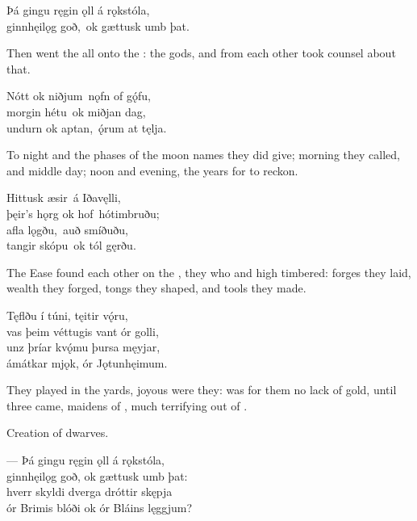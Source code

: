 \bva Þá gingu ręgin ǫll \hld á rǫkstóla, \\%
ginnhęilǫg goð, \hld ok gættusk umb þat.\footnotemark[1]\eva
{}

\bvb Then went the  all onto the : the  gods, and from each other took counsel about that.\evb

\bva Nótt ok niðjum \hld nǫfn of gǫ́fu, \\%
morgin hétu \hld ok miðjan dag, \\%
undurn ok aptan, \hld ǫ́rum at tęlja.\footnotemark[1]\eva
{}

\bvb To night and the phases of the moon names they did give; morning they called, and middle day; noon and evening, the years for to reckon.\evb

\bva Hittusk æsir \hld á Iðavęlli, \\%
þęir’s hǫrg ok hof \hld hótimbruðu; \\%
afla lǫgðu, \hld auð smíðuðu, \\%
tangir skópu \hld ok tól gęrðu.\eva

\bvb The Ease found each other on the , they who  and  high timbered: forges they laid, wealth they forged, tongs they shaped, and tools they made.\evb

\bva Tęflðu í túni, \hld tęitir vǫ́ru, \\%
vas þeim véttugis \hld vant ór golli, \\%
unz þríar kvǫ́mu \hld þursa męyjar, \\%
ámátkar mjǫk, \hld ór Jǫtunhęimum.\eva

\bvb They played  in the yards, joyous were they: was for them no lack of gold, until three came, maidens of , much terrifying out of .\footnotemark[1]\evb
{}

\small{Creation of dwarves.}

\bva — Þá gingu ręgin ǫll \hld á rǫkstóla, \\%
ginnhęilǫg goð, \hld ok gættusk umb þat: \\%
hverr skyldi dverga \hld dróttir skępja \\%
ór Brimis blóði \hld ok ór Bláins lęggjum?\footnotemark[1]\eva
{}

